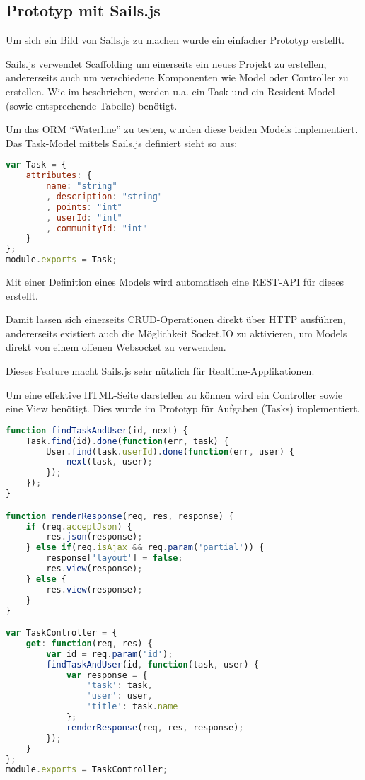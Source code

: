 \subsection{Prototyp mit Sails.js}
Um sich ein Bild von Sails.js zu machen wurde ein einfacher Prototyp \cite{SailsPrototyp} erstellt.

Sails.js verwendet \gls{Scaffolding} um einerseits ein neues Projekt zu erstellen, andererseits auch um verschiedene Komponenten wie Model oder Controller zu erstellen. Wie im  beschrieben, werden u.a. ein Task und ein Resident Model (sowie entsprechende Tabelle) benötigt.

Um das \gls{ORM} ``Waterline'' \cite{Waterline} zu testen, wurden diese beiden Models implementiert. Das Task-Model mittels Sails.js definiert sieht so aus:

\begin{lstlisting}[language=JavaScript, caption=Task Model in Sails.js]
var Task = {
	attributes: {
		name: "string"
		, description: "string"
		, points: "int"
		, userId: "int"
		, communityId: "int"
	}
};
module.exports = Task;
\end{lstlisting}

Mit einer Definition eines Models wird automatisch eine \gls{REST}-API für dieses erstellt.

Damit lassen sich einerseits CRUD-Operationen direkt über HTTP ausführen, andererseits existiert auch die Möglichkeit Socket.IO \cite{SocketIO} zu aktivieren, um Models direkt von einem offenen \gls{Websocket} zu verwenden.

Dieses Feature macht Sails.js sehr nützlich für \gls{Realtime}-Applikationen.

Um eine effektive HTML-Seite darstellen zu können wird ein Controller sowie eine View benötigt. Dies wurde im Prototyp für Aufgaben (Tasks) implementiert.

\newpage
\begin{lstlisting}[language=JavaScript, caption=Task Controller in Sails.js, label=lst:sailsjstaskcontroller]
function findTaskAndUser(id, next) {
	Task.find(id).done(function(err, task) {
		User.find(task.userId).done(function(err, user) {
			next(task, user);
		});
	});
}

function renderResponse(req, res, response) {
	if (req.acceptJson) {
		res.json(response);
	} else if(req.isAjax && req.param('partial')) {
		response['layout'] = false;
		res.view(response);
	} else {
		res.view(response);
	}
}

var TaskController = {
	get: function(req, res) {
		var id = req.param('id');
		findTaskAndUser(id, function(task, user) {
			var response = {
				'task': task,
				'user': user,
				'title': task.name
			};
			renderResponse(req, res, response);
		});
	}
};
module.exports = TaskController;
\end{lstlisting}

